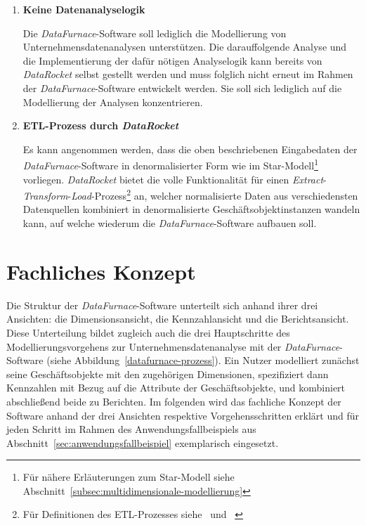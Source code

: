 \documentclass[
  language=german, %
  type=bachelor,%
  ngerman
]{isthesis}
\begin{document}
\begin{content}
\begin{enumerate}
    \item \textbf{Keine Datenanalyselogik}

      Die \textit{DataFurnace}-Software soll lediglich die Modellierung von
      Unternehmensdatenanalysen unterstützen. Die darauffolgende Analyse und
      die Implementierung der dafür nötigen Analyselogik kann bereits von
      \textit{DataRocket} selbst gestellt werden und muss folglich nicht erneut
      im Rahmen der \textit{DataFurnace}-Software entwickelt werden. Sie soll
      sich lediglich auf die Modellierung der Analysen konzentrieren.

    \item \textbf{\acrshort{ETL}-Prozess durch \textit{DataRocket}}

			Es kann angenommen werden, dass die oben beschriebenen Eingabedaten der
			\textit{DataFurnace}-Software in denormalisierter Form wie im
			Star-Modell\footnote{Für nähere Erläuterungen zum Star-Modell siehe
			Abschnitt~\ref{subsec:multidimensionale-modellierung}} vorliegen.
			\textit{DataRocket} bietet die volle Funktionalität für einen
			\textit{Extract}-\textit{Transform}-\textit{Load}-Prozess\footnote{Für
			Definitionen des ETL-Prozesses
			siehe~\textsc{\citeauthor{vassiliadis2002conceptual}}
			\citeyearpar{vassiliadis2002conceptual}
			und~\textsc{\citeauthor{trujillo2003uml}} \citeyearpar{trujillo2003uml}}
			an, welcher normalisierte Daten aus verschiedensten Datenquellen
			kombiniert in denormalisierte Geschäftsobjektinstanzen wandeln kann, auf
			welche wiederum die \textit{DataFurnace}-Software aufbauen soll.

  \end{enumerate}



  \section{Fachliches Konzept}\label{sec:software/fachliches-konzept}

  Die Struktur der \textit{DataFurnace}-Software unterteilt sich anhand ihrer
  drei Ansichten: die Dimensionsansicht, die Kennzahlansicht und die
  Berichtsansicht. Diese Unterteilung bildet zugleich auch die drei
  Hauptschritte des Modellierungsvorgehens zur Unternehmensdatenanalyse mit der
  \textit{DataFurnace}-Software (siehe Abbildung~\ref{datafurnace-prozess}).
  Ein Nutzer modelliert zunächst seine Geschäftsobjekte mit den zugehörigen
  Dimensionen, spezifiziert dann Kennzahlen mit Bezug auf die Attribute der
  Geschäftsobjekte, und kombiniert abschließend beide zu Berichten. Im
  folgenden wird das fachliche Konzept der Software anhand der drei Ansichten
  respektive Vorgehensschritten erklärt und für jeden Schritt im Rahmen des
  Anwendungsfallbeispiels aus Abschnitt~\ref{sec:anwendungsfallbeispiel}
  exemplarisch eingesetzt.


\end{content}
\end{document}
